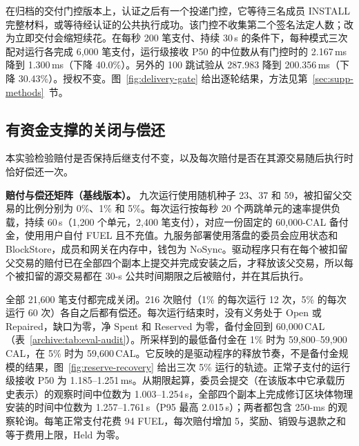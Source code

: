 在归档的交付门控版本上，认证之后有一个投递门控，它等待三名成员 INSTALL 完整材料，或等待经认证的公共执行成功。该门控不收集第二个签名法定人数；改为立即交付会缩短续花。在每秒 200 笔支付、持续 30\,s 的条件下，每种模式三次配对运行各完成 6,000 笔支付，运行级接收 P50 的中位数从有门控时的 2.167\,ms 降到 1.300\,ms（下降 40.0\%）。另外的 100 跳试验从 287.983 降到 200.356\,ms（下降 30.43\%）。授权不变。图~\ref{fig:delivery-gate} 给出逐轮结果，方法见第~\ref{sec:supp-methods}~节。

\subsection{有资金支撑的关闭与偿还}
\label{archive:sec:eval-liabilities}

本实验检验赔付是否保持后继支付不变，以及每次赔付是否在其源交易随后执行时恰好偿还一次。

\noindent\textbf{赔付与偿还矩阵（基线版本）。}
九次运行使用随机种子 23、37 和 59，被扣留父交易的比例分别为 0\%、1\% 和 5\%。每次运行按每秒 20 个两跳单元的速率提供负载，持续 60\,s（1,200 个单元，2,400 笔支付），对应一份固定的 60,000-CAL 备付金，使用用户自付 FUEL 且不充值。九服务部署使用落盘的委员会应用状态和 BlockStore，成员和网关在内存中，钱包为 NoSync。驱动程序只有在每个被扣留父交易的赔付已在全部四个副本上提交并完成安装之后，才释放该父交易，所以每个被扣留的源交易都在 30-s 公共时间期限之后被赔付，并在其后执行。

全部 21,600 笔支付都完成关闭。216 次赔付（1\% 的每次运行 12 次，5\% 的每次运行 60 次）各自之后都有偿还。每次运行结束时，没有义务处于 Open 或 Repaired，缺口为零，净 Spent 和 Reserved 为零，备付金回到 60,000\,CAL（表~\ref{archive:tab:eval-audit}）。所采样到的最低备付金在 1\% 时为 59,800--59,900\,CAL，在 5\% 时为 59,600\,CAL。它反映的是驱动程序的释放节奏，不是备付金规模的结果，图~\ref{fig:reserve-recovery} 给出三次 5\% 运行的轨迹。正常子支付的运行级接收 P50 为 1.185--1.251\,ms。从期限起算，委员会提交（在该版本中它承载历史表示）的观察时间中位数为 1.003--1.254\,s，全部四个副本上完成修订区块体物理安装的时间中位数为 1.257--1.761\,s（P95 最高 2.015\,s）；两者都包含 250-ms 的观察轮询。每笔正常支付花费 94 FUEL，每次赔付增加 5，奖励、销毁与退款之和等于费用上限，Held 为零。

